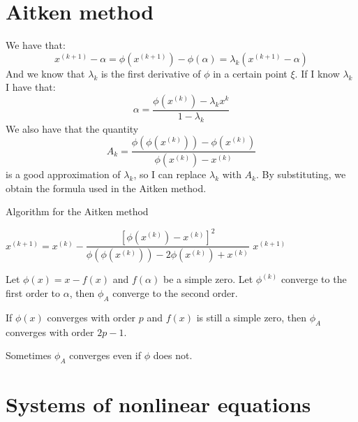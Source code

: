 \documentclass[12pt, a4paper]{report}
\begin{document}
    \section{Aitken method}
    We have that: 
    \[x^{(k+1)}-\alpha=\phi(x^{(k+1)})-\phi(\alpha)=\lambda_k\left( x^{(k+1)}-\alpha \right)\]
    And we know that $\lambda_k$ is the first derivative of $\phi$ in a certain point $\xi$. If I know $\lambda_k$ I have that: 
    \[\alpha=\dfrac{\phi(x^{(k)})-\lambda_k x^{k}}{1-\lambda_k}\]
    We also have that the quantity 
    \[A_k=\dfrac{\phi(\phi(x^{(k)}))-\phi(x^{(k)})}{\phi(x^{(k)})-x^{(k)}}\]
    is a good approximation of $\lambda_k$, so I can replace $\lambda_k$ with $A_k$. By substituting, we obtain the formula used in the Aitken method. 
    \begin{algorithm}[H]
        \caption{Algorithm for the Aitken method}
            \begin{algorithmic}[1]
                    \State $x^{(k+1)}=x^{(k)}-\dfrac{\left[ \phi(x^{(k)})-x^{(k)} \right]^2}{\phi(\phi(x^{(k)}))-2\phi(x^{(k)})+x^{(k)}}$
                        \State \Return $x^{(k+1)}$
                    \EndIf
                \EndFor
            \end{algorithmic}
    \end{algorithm}
    \begin{theorem}
        Let $\phi(x)=x-f(x)$ and $f(\alpha)$ be a simple zero. Let $\phi^{(k)}$ converge to the first order to $\alpha$, then $\phi_A$ converge to the second order. 

        If $\phi(x)$ converges with order $p$ and $f(x)$ is still a simple zero, then $\phi_A$ converges with order $2p-1$. 
    \end{theorem}
    Sometimes $\phi_A$ converges even if $\phi$ does not. 

    \section{Systems of nonlinear equations}
\end{document}
